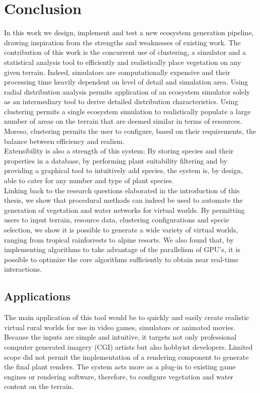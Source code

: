 \chapter{Conclusion} \label{chap:conclusion}

In this work we design, implement and test a new ecosystem generation pipeline, drawing inspiration from the strengths and weaknesses of existing work. The contribution of this work is the concurrent use of clustering, a simulator and a statistical analysis tool to efficiently and realistically place vegetation on any given terrain. Indeed, simulators are computationally expensive and their processing time heavily dependent on level of detail and simulation area. Using radial distribution analysis permits application of an ecosystem simulator solely as an intermediary tool to derive detailed distribution characteristics. Using clustering permits a single ecosystem simulation to realistically populate a large number of areas on the terrain that are deemed similar in terms of resources. Moreso, clustering permits the user to configure, based on their requirements, the balance between efficiency and realism. \\
Extensibility is also a strength of this system; By storing species and their properties in a database, by performing plant suitability filtering and by providing a graphical tool to intuitively add species, the system is, by design, able to cater for any number and type of plant species.\\
Linking back to the research questions elaborated in the introduction of this thesis, we show that procedural methods can indeed be used to automate the generation of vegetation and water networks for virtual worlds. By permitting users to input terrain, resource data, clustering configurations and specie selection, we show it is possible to generate a wide variety of virtual worlds, ranging from tropical rainforrests to alpine resorts. We also found that, by implementing algorithms to take advantage of the parallelism of GPU's, it is possible to optimize the core algorithms sufficiently to obtain near real-time interactions. \\

\section{Applications} \label{sec:applications}

The main application of this tool would be to quickly and easily create realistic virtual rural worlds for use in video games, simulators or animated movies. Because the inputs are simple and intuitive, it targets not only professional computer generated imagery (CGI) artists but also hobbyist developers. Limited scope did not permit the implementation of a rendering component to generate the final plant renders. The system acts more as a plug-in to existing game engines or rendering software, therefore, to configure vegetation and water content on the terrain.\\

